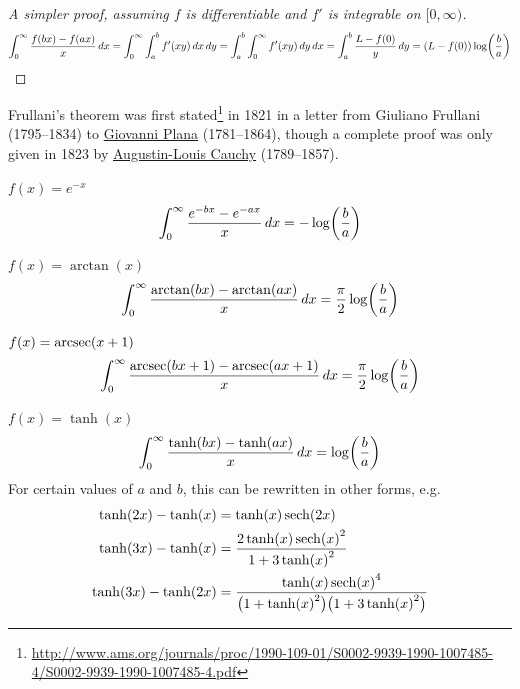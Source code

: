 \documentclass[main.tex]{subfiles}
\begin{document}
\begin{proof}[A simpler proof, assuming $f$ is differentiable and $f'$ is integrable on $[0,\infty)$]
    \begin{equation*}
        \int_0^\infty \frac{f(bx)-f(ax)}{x}\,dx
        = \int_0^\infty \int_a^b f'(xy)\,dx\,dy
        = \int_a^b \int_0^\infty f'(xy)\,dy\,dx
        = \int_a^b \frac{L-f(0)}{y}\,dy
        = (L-f(0))\log(\frac{b}{a}) \qedhere
    \end{equation*}
\end{proof}

Frullani's theorem was first stated\footnote{\url{http://www.ams.org/journals/proc/1990-109-01/S0002-9939-1990-1007485-4/S0002-9939-1990-1007485-4.pdf}} in 1821 in a letter from Giuliano Frullani (1795--1834) to \href{https://mathshistory.st-andrews.ac.uk/Biographies/Plana/}{Giovanni Plana} (1781--1864), though a complete proof
was only given in 1823 by \href{https://mathshistory.st-andrews.ac.uk/Biographies/Cauchy/}{Augustin-Louis Cauchy} (1789--1857).

\begin{example}
    $f(x)=e^{-x}$
    \begin{equation*}
        \int_0^\infty \frac{e^{-bx}-e^{-ax}}{x}\,dx = -\log(\frac{b}{a})
    \end{equation*}
\end{example}

\begin{example}
    $f(x)=\arctan(x)$
    \begin{equation*}
        \int_0^\infty \frac{\arctan(bx)-\arctan(ax)}{x}\,dx = \frac{\pi}{2}\log(\frac{b}{a})
    \end{equation*}
\end{example}

\begin{example}
    $f(x)=\arcsec(x+1)$
    \begin{equation*}
        \int_0^\infty \frac{\arcsec(bx+1)-\arcsec(ax+1)}{x}\dx = \frac{\pi}{2}\log(\frac{b}{a})
    \end{equation*}
\end{example}

\begin{example}
    $f(x)=\tanh(x)$
    \begin{equation*}
        \int_0^\infty \frac{\tanh(bx)-\tanh(ax)}{x}\,dx = \log(\frac{b}{a})
    \end{equation*}
    For certain values of $a$ and $b$, this can be rewritten in other forms, e.g.
    \begin{align*}
        \tanh(2x)-\tanh(x)
        &= \tanh(x)\sech(2x) \\
        \tanh(3x)-\tanh(x)
        &= \frac{2\tanh(x)\sech(x)^2}{1+3\tanh(x)^2} \\
        \tanh(3x)-\tanh(2x)
        &= \frac{\tanh(x)\sech(x)^4}{\qty\big(1+\tanh(x)^2)\qty\big(1+3\tanh(x)^2)}
    \end{align*}
\end{example}
\end{document}
